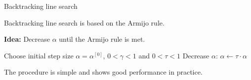 \documentclass[11pt,compress,t,notes=noshow, xcolor=table]{beamer}
\begin{document}
	\begin{vbframe}{Backtracking line search}
		
		Backtracking line search is based on the Armijo rule.
		
		\lz
		
		\textbf{Idea: } Decrease $\alpha$ until the Armijo rule is met.
		
		\begin{algorithm}[H]
			\caption{Backtracking line search}
			\begin{algorithmic}[1]
				\State Choose initial step size $\alpha = \alpha^{[0]}$, $0 < \gamma < 1$ and $0 < \tau < 1$
				\State Decrease $\alpha$: $\alpha \leftarrow \tau \cdot \alpha$
				\EndWhile
			\end{algorithmic}
		\end{algorithm}
		
		The procedure is simple and shows good performance in practice.
		
	\end{vbframe}
	
\end{document}
